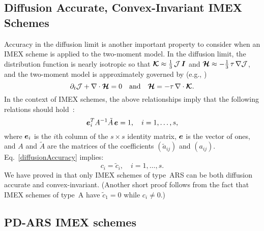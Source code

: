 \subsection{Diffusion Accurate, Convex-Invariant IMEX Schemes}

Accuracy in the diffusion limit is another important property to consider when an IMEX scheme is applied to the two-moment model.  
In the diffusion limit, the distribution function is nearly isotropic so that $\boldsymbol{\mathcal{K}}\approx\frac{1}{3}\,\mathcal{J}\,\boldsymbol{I}$ and $\boldsymbol{\mathcal{H}}\approx-\frac{1}{3}\,\tau\,\nabla\mathcal{J}$, and the two-moment model is approximately governed by (e.g., \cite{jinLevermore_1996})
\begin{equation}
  \partial_{t}{\mathcal{J}} + \nabla\cdot\boldsymbol{\mathcal{H}} = 0
  \quad\text{and}\quad
  \boldsymbol{\mathcal{H}} = - \tau\,\nabla\cdot\boldsymbol{\mathcal{K}}.  
  \label{eq:diffusionLimit}
\end{equation}
In the context of IMEX schemes, the above relationships imply that the following relations should hold~\cite{chu_etal_2018}:
\begin{equation}
   \boldsymbol{e}_{i}^{T}A^{-1}\tilde{A}\,\boldsymbol{e} = 1, \quad i=1,\ldots,s,
   \label{diffusionAccuracy}
\end{equation}
where $\boldsymbol{e}_{i}$ is the $i$th column of the $s\times s$ identity matrix, $\boldsymbol{e}$ is the vector of ones, and $A$ and $\tilde{A}$ are the matrices of the coefficients $(\tilde{a}_{ij})$ and $(a_{ij})$.
Eq.~\eqref{diffusionAccuracy} implies:
\begin{equation}
  c_{i} = \tilde{c}_{i}, \quad i=1,\ldots,s.
\end{equation}
We have proved in \cite{chu_etal_2018} that only IMEX schemes of type~ARS can be both diffusion accurate and convex-invariant.  
(Another short proof follows from the fact that IMEX schemes of type~A have $\tilde{c}_1 = 0$ while $c_i \neq 0$.)  

\subsection{PD-ARS IMEX schemes}

